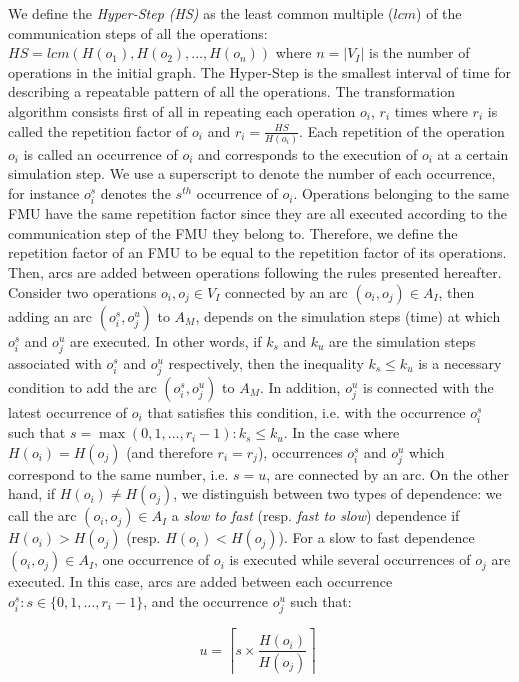 We define the \textit{Hyper-Step (HS)} as the least common multiple ($lcm$) of the communication steps of all the operations: $HS=lcm(H(o_1),H(o_2), \dots ,H(o_n))$ where $n = |V_I|$ is the number of operations in the initial graph. The Hyper-Step is the smallest interval of time for describing a repeatable pattern of all the operations. The transformation algorithm consists first of all in repeating each operation $o_i$, $r_i$ times where $r_i$ is called the repetition factor of $o_i$ and $r_i = \frac{HS}{H(o_i)}$. Each repetition of the operation $o_i$ is called an occurrence of $o_i$ and corresponds to the execution of $o_i$ at a certain simulation step. We use a superscript to denote the number of each occurrence, for instance $o_i^s$ denotes the $s^{th}$ occurrence of $o_i$. Operations belonging to the same FMU have the same repetition factor since they are all executed according to the communication step of the FMU they belong to. Therefore, we define the repetition factor of an FMU to be equal to the repetition factor of its operations. Then, arcs are added between operations following the rules presented hereafter. Consider two operations $o_i, o_j \in V_I$ connected by an arc $(o_i,o_j) \in A_I$, then adding an arc $(o_i^s,o_j^u)$ to $A_M$, depends on the simulation steps (time) at which $o_i^s$ and $o_j^u$ are executed. In other words, if $k_{s}$ and $k_{u}$ are the simulation steps associated with $o_i^s$ and $o_j^u$ respectively, then the inequality $k_{s} \leq k_{u}$ is a necessary condition to add the arc $(o_i^s,o_j^u)$ to $A_M$. In addition, $o_j^u$ is connected with the latest occurrence of $o_i$ that satisfies this condition, i.e. with the occurrence $o_i^s$ such that $s=\max(0,1, \dots ,r_i-1) : k_{s} \leq k_{u}$. In the case where $H(o_i) = H(o_j)$ (and therefore $r_i = r_j$), occurrences $o_i^s$ and $o_j^u$ which correspond to the same number, i.e. $s = u$, are connected by an arc. On the other hand, if $H(o_i) \neq H(o_j)$, we distinguish between two types of dependence: we call the arc $(o_i,o_j) \in A_I$ a \textit{slow to fast} (resp. \textit{fast to slow}) dependence if $H(o_i) > H(o_j)$ (resp. $H(o_i) < H(o_j)$). For a slow to fast dependence $(o_i,o_j) \in A_I$, one occurrence of $o_i$ is executed while several occurrences of $o_j$ are executed. In this case, arcs are added between each occurrence $o_i^s: s \in \{0,1, \dots ,r_i-1\}$, and the occurrence $o_j^u$ such that:

\begin{equation}
u = \left \lceil{s \times \frac{H(o_i)}{H(o_j)}}\right \rceil\;
\end{equation}

